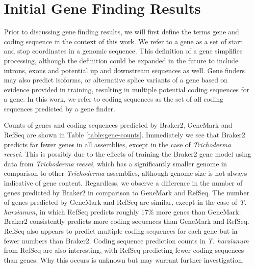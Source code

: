 \section{Initial Gene Finding Results} 
\label{section:gene-finding}

Prior to discussing gene finding results, we will first define the
terms gene and coding sequence in the context of this work. We refer
to a gene as a set of start and stop coordinates in a genomic
sequence. This definition of a gene simplifies processing, although
the definition could be expanded in the future to include introns,
exons and potential up and downstream sequences as well. Gene finders
may also predict isoforms, or alternative splice variants of a gene
based on evidence provided in training, resulting in multiple
potential coding sequences for a gene. In this work, we refer to
coding sequences as the set of all coding sequences predicted by a
gene finder.

Counts of genes and coding sequences predicted by Braker2, GeneMark
and RefSeq are shown in Table \ref{table:gene-counts}. Immediately we
see that Braker2 predicts far fewer genes in all assemblies, except in
the case of \textit{Trichoderma reesei.} This is possibly due to the
effects of training the Braker2 gene model using data from
\textit{Trichoderma reesei}, which has a significantly smaller genome
in comparison to other \textit{Trichoderma} assemblies, although
genome size is not always indicative of gene content. Regardless, we
observe a difference in the number of genes predicted by Braker2 in
comparison to GeneMark and RefSeq. The number of genes predicted by
GeneMark and RefSeq are similar, except in the case of
\textit{T. harzianum}, in which RefSeq predicts roughly 17\% more
genes than GeneMark. Braker2 consistently predicts more coding
sequences than GeneMark and RefSeq. RefSeq also appears to predict
multiple coding sequences for each gene but in fewer numbers than
Braker2. Coding sequence prediction counts in \textit{T. harzianum}
from RefSeq are also interesting, with RefSeq predicting fewer coding
sequences than genes. Why this occurs is unknown but may warrant
further investigation.

